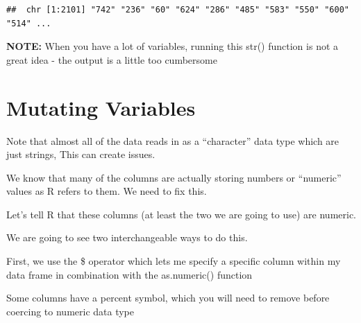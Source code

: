 \documentclass[
]{book}
\newenvironment{Shaded}{\begin{snugshade}}{\end{snugshade}}
\newcommand{\DecValTok}[1]{\textcolor[rgb]{0.00,0.00,0.81}{#1}}
\newcommand{\KeywordTok}[1]{\textcolor[rgb]{0.13,0.29,0.53}{\textbf{#1}}}
\newcommand{\NormalTok}[1]{#1}
\newcommand{\OperatorTok}[1]{\textcolor[rgb]{0.81,0.36,0.00}{\textbf{#1}}}
\begin{document}
\begin{Shaded}
\end{Shaded}

\begin{verbatim}
##  chr [1:2101] "742" "236" "60" "624" "286" "485" "583" "550" "600" "514" ...
\end{verbatim}

\textbf{NOTE:} When you have a lot of variables, running this str() function is not a great idea - the output is a little too cumbersome

\hypertarget{mutating-variables}{%
\section{Mutating Variables}\label{mutating-variables}}

Note that almost all of the data reads in as a ``character'' data type which are just strings,
This can create issues.

We know that many of the columns are actually storing numbers or ``numeric'' values as R refers to them.
We need to fix this.

Let's tell R that these columns (at least the two we are going to use) are numeric.

We are going to see two interchangeable ways to do this.

First, we use the \$ operator which lets me specify a specific column within my data frame in combination with the as.numeric() function

\begin{Shaded}
\end{Shaded}

Some columns have a percent symbol, which you will need to remove before coercing to numeric data type
\end{document}
